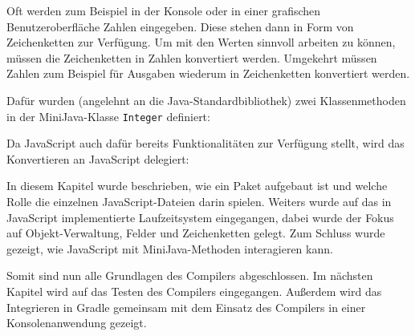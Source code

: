 Oft werden zum Beispiel in der Konsole oder in einer grafischen Benutzeroberfläche Zahlen eingegeben. Diese stehen dann in Form von Zeichenketten zur Verfügung. Um mit den Werten sinnvoll arbeiten zu können, müssen die Zeichenketten in Zahlen konvertiert werden. Umgekehrt müssen Zahlen zum Beispiel für Ausgaben wiederum in Zeichenketten konvertiert werden.

Dafür wurden (angelehnt an die Java-Standardbibliothek) zwei Klassenmethoden in der MiniJava-Klasse \lstinline{Integer} definiert:


\pagebreak
Da JavaScript auch dafür bereits Funktionalitäten zur Verfügung stellt, wird das Konvertieren an JavaScript delegiert:


\vspace{4em}
In diesem Kapitel wurde beschrieben, wie ein Paket aufgebaut ist und welche Rolle die einzelnen JavaScript-Dateien darin spielen. Weiters wurde auf das in JavaScript implementierte Laufzeitsystem eingegangen, dabei wurde der Fokus auf Objekt-Verwaltung, Felder und Zeichenketten gelegt. Zum Schluss wurde gezeigt, wie JavaScript mit MiniJava-Methoden interagieren kann.

Somit sind nun alle Grundlagen des Compilers abgeschlossen. Im nächsten Kapitel wird auf das Testen des Compilers eingegangen. Außerdem wird das Integrieren in Gradle gemeinsam mit dem Einsatz des Compilers in einer Konsolenanwendung gezeigt.
